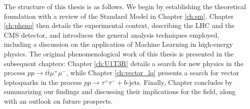 The structure of this thesis is as follows. We begin by establishing the theoretical foundation with a review of the Standard Model in Chapter \ref{ch:sm}. Chapter \ref{ch:pheno} then details the experimental context, describing the LHC and the CMS detector, and introduces the general analysis techniques employed, including a discussion on the application of Machine Learning in high-energy physics. The original phenomenological work of this thesis is presented in the subsequent chapters: Chapter \ref{ch:U1T3R} details a search for new physics in the process $pp \to t\bar{t}\mu^+\mu^-$, while Chapter \ref{ch:vector_lq} presents a search for vector leptoquarks in the process $pp \to \tau^+\tau^- + b\text{-jets}$. Finally, Chapter \label{ch:discussion} concludes by summarizing our findings and discussing their implications for the field, along with an outlook on future prospects.

